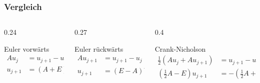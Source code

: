 %
%
%
\begin{frame}
\frametitle{Vergleich}
\vspace{-15pt}
\begin{columns}[t]
\begin{column}{0.24\hsize}
\begin{block}{Euler vorwärts}
\vspace{-15pt}
\begin{align*}
Au_j
&=
u_{j+1} - u_j
\\
u_{j+1} &= (A+E)u_j
\end{align*}
\end{block}
\end{column}
\begin{column}{0.27\hsize}
\begin{block}{Euler rückwärts}
\vspace{-15pt}
\begin{align*}
Au_{j+1}
&=
u_{j+1} - u_j
\\
u_{j+1}
&=
(E-A)^{-1}
u_{j}
\end{align*}
\end{block}
\end{column}
\begin{column}{0.4\hsize}
\begin{block}{Crank-Nicholson}
\vspace{-15pt}
\begin{align*}
{\textstyle\frac12}(Au_j + Au_{j+1}) &= u_{j+1}-u_j
\\
({\textstyle\frac12}A-E)u_{j+1}&=-({\textstyle\frac12}A+E)u_j
\end{align*}
\end{block}
\end{column}
\end{columns}


\end{frame}
